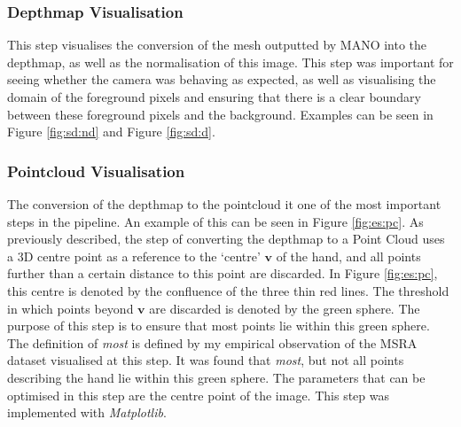 \subsubsection{Depthmap Visualisation}
This step visualises the conversion of the mesh outputted by MANO into the depthmap, as well as the normalisation of this image. This step was important for seeing whether the camera was behaving as expected, as well as visualising the domain of the foreground pixels and ensuring that there is a clear boundary between these foreground pixels and the background. Examples can be seen in Figure \ref{fig:sd:nd} and Figure \ref{fig:sd:d}.

\subsubsection{Pointcloud Visualisation}
The conversion of the depthmap to the pointcloud it one of the most important steps in the pipeline. An example of this can be seen in Figure \ref{fig:es:pc}. As previously described, the step of converting the depthmap to a Point Cloud uses a 3D centre point as a reference to the `centre' $\bm{v}$ of the hand, and all points further than a certain distance to this point are discarded. In Figure \ref{fig:es:pc}, this centre is denoted by the confluence of the three thin red lines. The threshold in which points beyond $\bm{v}$ are discarded is denoted by the green sphere. The purpose of this step is to ensure that most points lie within this green sphere. The definition of {\slshape most} is defined by my empirical observation of the MSRA dataset visualised at this step. It was found that {\slshape most}, but not all points describing the hand lie within this green sphere. The parameters that can be optimised in this step are the centre point of the image. This step was implemented with {\slshape Matplotlib}.

